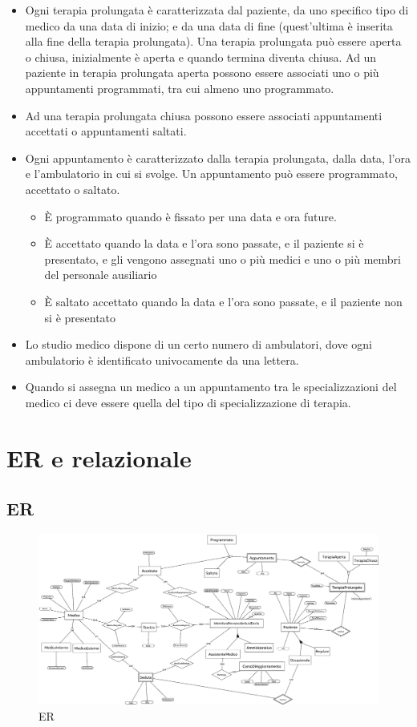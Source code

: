 \documentclass[11pt]{article}
\begin{document}
\begin{itemize}
    \item Ogni terapia prolungata è caratterizzata dal paziente, da uno specifico tipo di medico da una data di inizio; e da una data di fine (quest’ultima è inserita alla fine della terapia prolungata). Una terapia prolungata può essere aperta o chiusa, inizialmente è aperta e quando termina diventa chiusa. Ad un paziente in terapia prolungata aperta possono essere associati uno o più appuntamenti programmati, tra cui almeno uno programmato.
    \item Ad una terapia prolungata chiusa possono essere associati appuntamenti accettati o appuntamenti saltati.
    \item Ogni appuntamento è caratterizzato dalla terapia prolungata, dalla data, l’ora e l’ambulatorio in cui si svolge. Un appuntamento può essere programmato, accettato o saltato.
    \begin{itemize}
        \item È programmato quando è fissato per una data e ora future.
        \item È accettato quando la data e l’ora sono passate, e il paziente si è presentato, e gli vengono assegnati uno o più medici e uno o più membri del personale ausiliario
        \item È saltato accettato quando la data e l’ora sono passate, e il paziente non si è presentato
    \end{itemize} 
    \item Lo studio medico dispone di un certo numero di ambulatori, dove ogni ambulatorio è identificato univocamente da una lettera.
    \item Quando si assegna un medico a un appuntamento tra le specializzazioni del medico ci deve essere quella del tipo di specializzazione di terapia.

\end{itemize}

\section{ER e relazionale}

\subsection{ER}
\begin{figure}[H]
    \includegraphics[width=\linewidth]{images/ER1.png}
    \caption{ER}
    \label{fig:ER}
\end{figure}
\end{document}
